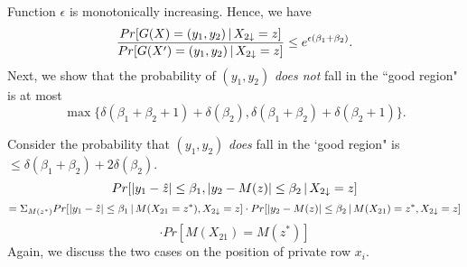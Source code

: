 \documentclass[11pt]{article}
\begin{document}
Function $\epsilon$ is monotonically increasing. Hence, we have
\[
\frac{Pr[G(X) = (y_{1}, y_{2})\,|\,X_{2 \downarrow}=z]}{Pr[G(X') = (y_{1}, y_{2})\,|\,X_{2 \downarrow}=z]} \leq e^{\epsilon(\beta_{1}+\beta_{2})}.
\]
Next, we show that the probability of $(y_{1}, y_{2}) $ {\it does not} fall in the ``good region" is at most
\[
\max \{ \delta(\beta_{1}+\beta_{2}+1)+ \delta(\beta_{2}) ,  \delta(\beta_{1}+\beta_{2})+ \delta(\beta_{2}+1) \}.
\] 

Consider the probability that $(y_{1}, y_{2}) $ {\it does} fall in the `good region" is $\leq \delta(\beta_{1}+\beta_{2})+ 2\delta(\beta_{2})$. 
\begin{equation}\label{tail}
Pr[|y_{1} - \hat{z}| \leq \beta_{1}, |y_{2} - M(z)| \leq \beta_{2}\,|\,X_{2 \downarrow} = z]
\end{equation}
\[
=\Sigma_{M(z^{*})} Pr[|y_{1} - \hat{z}| \leq \beta_{1}\,|\, M(X_{21}=z^{*}),X_{2 \downarrow} = z] \cdot Pr[|y_{2} - M(z)| \leq \beta_{2}\,|\,M(X_{21})=z^{*},X_{2 \downarrow} = z] 
\]
\[
\cdot Pr [M(X_{21}) = M(z^{*})]
\]
Again, we discuss the two cases on the position of private row $x_{i}$.
\end{document}
